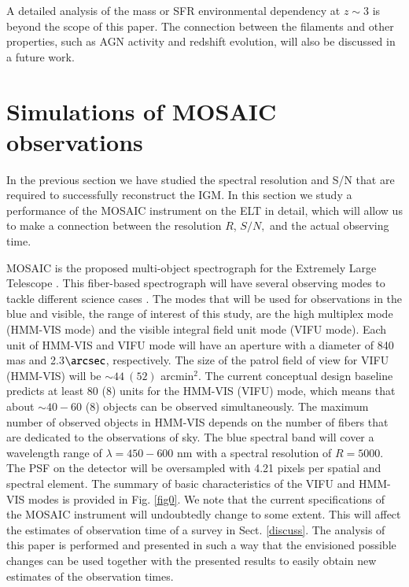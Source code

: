 \documentclass{aa}
\begin{document}
A detailed analysis of the mass or SFR environmental dependency at $z \sim 3$ is beyond the scope of this paper. The connection between the filaments and other properties, such as AGN activity and redshift evolution, will also be discussed in a future work.

\section{Simulations of MOSAIC observations}
\label{mosaic}

In the previous section we have studied the spectral resolution and S/N that are required to successfully reconstruct the IGM. In this section we study a performance of the MOSAIC instrument on the ELT in detail, which will allow us to make a connection between the resolution $R$, $S/N,$ and the actual observing time.

MOSAIC is the proposed multi-object spectrograph for the Extremely Large Telescope \citep{Morris2018}. This fiber-based spectrograph will have several observing modes to tackle different science cases \citep{Evans2015,Puech2018,Jagourel2018}. The modes that will be used for observations in the blue and visible, the range of interest of this study, are the high multiplex mode (HMM-VIS mode) and the visible integral field unit mode (VIFU mode). Each unit of HMM-VIS and VIFU mode will have an aperture with a diameter of 840 mas and 2.3$\arcsec$, respectively. The size of the patrol field of view for VIFU (HMM-VIS) will be $\sim 44 ~(52)$ arcmin$^{2}$. The current conceptual design baseline predicts at least 80 (8) units for the HMM-VIS (VIFU) mode, which means that about $\sim 40-60$ (8) objects can be observed simultaneously. The maximum number of observed objects in HMM-VIS depends on the number of fibers that are dedicated to the observations of sky. The blue spectral band will cover a wavelength range of $\lambda = 450 - 600$ nm with a spectral resolution of $R = 5000$. The PSF on the detector will be oversampled with 4.21 pixels per spatial and spectral element. The summary of basic characteristics of the VIFU and HMM-VIS modes is provided in Fig. \ref{fig0}. We note that the current specifications of the MOSAIC instrument will undoubtedly change to some extent. This will affect the estimates of observation time of a survey in Sect. \ref{discuss}. The analysis of this paper is performed and presented in such a way that the envisioned possible changes can be used together with the presented results to easily obtain new estimates of the observation times.
\end{document}
